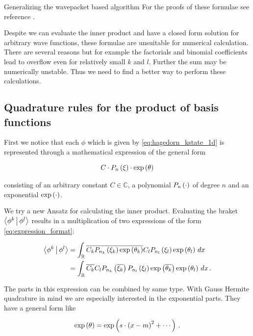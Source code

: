 \begin{chapter}{Generalizing the wavepacket based algorithm}
For the proofs of these formulae see reference \cite{H_R_quantization_rules}.

Despite we can evaluate the inner product and have a closed form solution for arbitrary
wave functions, these formulae are unsuitable for numerical calculation. There are
several reasons but for example the factorials and binomial coefficients lead to
overflow even for relatively small $k$ and $l$. Further the sum may be numerically
unstable. Thus we need to find a better way to perform these calculations.

\subsection{Quadrature rules for the product of basis functions}

First we notice that each $\phi$ which is given by \eqref{eq:hagedorn_kstate_1d}
is represented through a mathematical expression of the general form

\begin{equation} \label{eq:expression_format}
  C \cdot P_n\left( \xi \right) \cdot \exp \left( \theta \right)
\end{equation}

consisting of an arbitrary constant $C \in \mathbb{C}$, a polynomial $P_n\left( \cdot \right)$
of degree $n$ and an exponential $\exp\left( \cdot \right)$.

We try a new Ansatz for calculating the inner product. Evaluating the braket $\Braket{\phi^k | \phi^l}$
results in a multiplication of two expressions of the form \eqref{eq:expression_format}:

\begin{equation} \label{eq:expression_reformat}
\begin{split}
  \Braket{\phi^k | \phi^l} & =
  \int_\mathbb{R} \overline{C_k P_{n_k}\left( \xi_k \right) \exp \left( \theta_k \right)} C_l P_{n_l}\left( \xi_l \right) \exp \left( \theta_l \right) \,dx \\
  & =   \int_\mathbb{R} \overline{C_k} C_l P_{n_k}\left( \overline{\xi_k} \right) P_{n_l}\left( \xi_l \right) \exp \left( \overline{\theta_k} \right) \exp \left( \theta_l \right) \,dx \,.
\end{split}
\end{equation}

The parts in this expression can be combined by same type. With Gauss Hermite quadrature in
mind we are especially interested in the exponential parts. They have a general form like

\begin{equation} \label{eq:expression_format_exponential}
  \exp\left( \theta \right) = \exp\left(s \cdot \left(x-m\right)^2 + \cdots \right) \,.
\end{equation}


\end{chapter}
